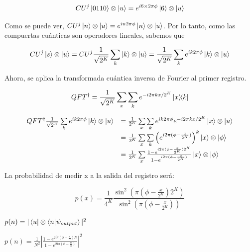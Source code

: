 \begin{equation}
    CU^j \ket{0110} \otimes \ket{u} = e^{i 6 \times 2\pi \phi} \ket{6} \otimes \ket{u}
\end{equation}

Como se puede ver, $CU^j \ket{n} \otimes \ket{u} = e^{i n 2\pi \phi} \ket{n} \otimes \ket{u}$. Por lo tanto, como las compuertas cuánticas son operadores lineales, sabemos que

\begin{equation}
    CU^j \ket{s} \otimes \ket{u} = CU^j \frac{1}{\sqrt{2^K}} \sum\limits_k \ket{k} \otimes \ket{u} = \frac{1}{\sqrt{2^K}} \sum\limits_k e^{i k 2\pi \phi} \ket{k} \otimes \ket{u}
\end{equation}

Ahora, se aplica la transformada cuántica inversa de Fourier al primer registro.

\begin{equation}
    QFT^\dagger = \frac{1}{\sqrt{2^K}} \sum\limits_x\sum\limits_k e^{-i 2\pi k x / 2^K} \ketbra{x}{k}
\end{equation}

\begin{equation}
\begin{array}{r l}
    QFT^\dagger \frac{1}{\sqrt{2^K}} \sum\limits_k e^{i k 2\pi \phi} \ket{k} \otimes \ket{u} &= \frac{1}{2^K} \sum\limits_x \sum\limits_k e^{i k 2\pi \phi} e^{-i 2\pi k x / 2^K} \ket{x} \otimes \ket{u} \\
    &= \frac{1}{2^K} \sum\limits_x\sum\limits_k \left(e^{i 2\pi (\phi - \frac{x}{2^K})}\right)^k \ket{x} \otimes \ket{\phi} \\
    &= \frac{1}{2^K} \sum\limits_x \frac{1 - e^{i 2\pi (\phi - \frac{x}{2^K}) 2^K}}{1 - e^{i 2\pi (\phi - \frac{x}{2^K})}} \ket{x} \otimes \ket{\phi} \\
\end{array}
\end{equation}

La probabilidad de medir x a la salida del registro será:

\begin{equation}
    p(x) = \frac{1}{4^{K}} \frac{\sin^2(\pi (\phi - \frac{x}{2^K}) 2^K)}{\sin^2(\pi (\phi - \frac{x}{2^K}))}
\end{equation}

$p(n) = |\bra{u} \otimes \bra{n} \ket{\psi_{output}}|^2$

$p(n) = \frac{1}{N^2} |\frac{1 - e^{2 i \pi (\phi - \frac{n}{N})N}}{1 - e^{2 i \pi (\phi - \frac{n}{N})}}|^2$

